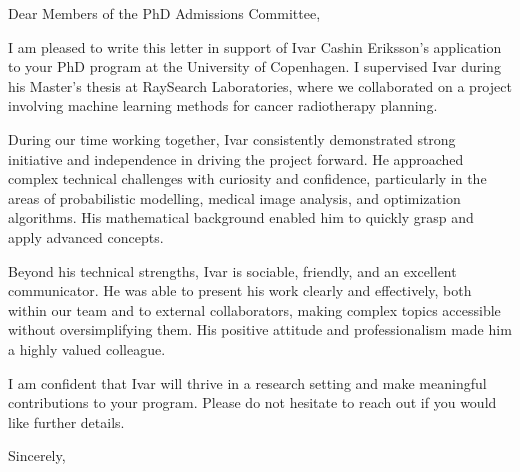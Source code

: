 \documentclass[11pt,a4paper]{letter}
\date{\today}
\begin{document}
\begin{letter}{}

\opening{Dear Members of the PhD Admissions Committee,}

I am pleased to write this letter in support of Ivar Cashin Eriksson's application to your PhD program at the University of Copenhagen. I supervised Ivar during his Master's thesis at RaySearch Laboratories, where we collaborated on a project involving machine learning methods for cancer radiotherapy planning.

During our time working together, Ivar consistently demonstrated strong initiative and independence in driving the project forward. He approached complex technical challenges with curiosity and confidence, particularly in the areas of probabilistic modelling, medical image analysis, and optimization algorithms. His mathematical background enabled him to quickly grasp and apply advanced concepts.

Beyond his technical strengths, Ivar is sociable, friendly, and an excellent communicator. He was able to present his work clearly and effectively, both within our team and to external collaborators, making complex topics accessible without oversimplifying them. His positive attitude and professionalism made him a highly valued colleague.

I am confident that Ivar will thrive in a research setting and make meaningful contributions to your program. Please do not hesitate to reach out if you would like further details.

\closing{Sincerely,}

\end{letter}
\end{document}
